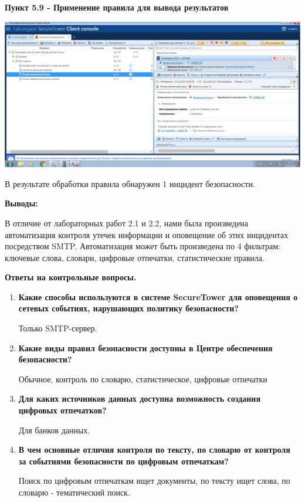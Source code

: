 \documentclass[a4paper,14pt]{extarticle}
\begin{document}
    \newpage
    \textbf{Пункт 5.9 - Применение правила для вывода результатов}
    \begin{center}
        \includegraphics[scale=0.25]{pics/5.9.jpg}

        В результате обработки правила обнаружен 1 инцидент безопасности.
    \end{center}

    \newpage
    \textbf{Выводы:}

    В отличие от лабораторных работ 2.1 и 2.2, нами была произведена автоматизация контроля 
    утечек информации и оповещение об этих инцидентах посредством SMTP. Автоматизация может 
    быть произведена по 4 фильтрам: ключевые слова, словари, цифровые отпечатки, 
    статистические правила.
    
    \textbf{Ответы на контрольные вопросы.}
    \begin{enumerate}
        \item \textbf{ Какие способы используются в системе SecureTower для оповещения о
        сетевых событиях, нарушающих политику безопасности?}

    \qquad Только SMTP-сервер. 
        \item \textbf{ Какие виды правил безопасности доступны в Центре обеспечения
        безопасности?}

    \qquad Обычное, контроль по словарю, статистическое, цифровые отпечатки
        \item \textbf{ Для каких источников данных доступна возможность создания цифровых
        отпечатков?}

    \qquad Для банков данных.
        \item \textbf{ В чем основные отличия контроля по тексту, по словарю от контроля за
        событиями безопасности по цифровым отпечаткам? }

    \qquad Поиск по цифровым отпечаткам ищет документы, по тексту ищет слова, по словарю - тематический поиск.
   \end{enumerate}
    
\end{document}
